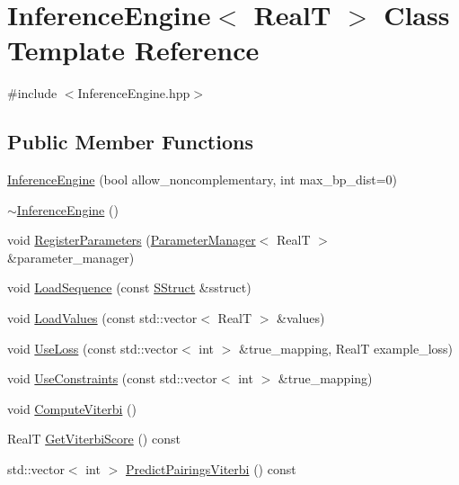 \hypertarget{class_inference_engine}{\section{Inference\+Engine$<$ Real\+T $>$ Class Template Reference}
\label{class_inference_engine}
}


{\ttfamily \#include $<$Inference\+Engine.\+hpp$>$}

\subsection*{Public Member Functions}
\begin{DoxyCompactItemize}
\item 
\hyperlink{class_inference_engine_ad8ecaebd1482737444c6ff701fde74de}{Inference\+Engine} (bool allow\+\_\+noncomplementary, int max\+\_\+bp\+\_\+dist=0)
\item 
\hyperlink{class_inference_engine_ab79efe41385aeef2e1703dc9335a4941}{$\sim$\+Inference\+Engine} ()
\item 
void \hyperlink{class_inference_engine_a5f4b92138aaa9a45fcc045f818286bd8}{Register\+Parameters} (\hyperlink{class_parameter_manager}{Parameter\+Manager}$<$ Real\+T $>$ \&parameter\+\_\+manager)
\item 
void \hyperlink{class_inference_engine_a092dc8818603fbc358e2226f3e743d62}{Load\+Sequence} (const \hyperlink{class_s_struct}{S\+Struct} \&sstruct)
\item 
void \hyperlink{class_inference_engine_abd2764fab807200098b69141b0d1eaca}{Load\+Values} (const std\+::vector$<$ Real\+T $>$ \&values)
\item 
void \hyperlink{class_inference_engine_a1c4ff1f7f65a76fa1111ef554ae17ed2}{Use\+Loss} (const std\+::vector$<$ int $>$ \&true\+\_\+mapping, Real\+T example\+\_\+loss)
\item 
void \hyperlink{class_inference_engine_a6a1c5eeb8bfb91e8562d9e937c7c46aa}{Use\+Constraints} (const std\+::vector$<$ int $>$ \&true\+\_\+mapping)
\item 
void \hyperlink{class_inference_engine_ad31521433bc7ca8747f42313571dca0d}{Compute\+Viterbi} ()
\item 
Real\+T \hyperlink{class_inference_engine_a12a4e655e8f06f81a06564f8f81499dc}{Get\+Viterbi\+Score} () const 
\item 
std\+::vector$<$ int $>$ \hyperlink{class_inference_engine_a09ba49b0dc0d9161d48a13f9948cbeea}{Predict\+Pairings\+Viterbi} () const 

\end{DoxyCompactItemize}
